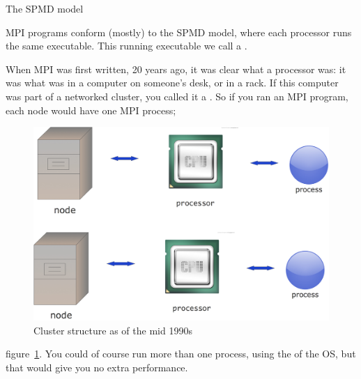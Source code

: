 
%
 {The SPMD model}

MPI programs conform (mostly)
to the \acf{SPMD} model, where each processor runs the same executable.
This running executable we call a .

When MPI was first written, 20 years ago, it was clear what a processor
was: it was what was in a computer on someone's desk, or in a rack.
If this computer was part of a networked cluster, you called it a .
So if you ran an MPI program, each node would have one MPI process;
%
\begin{figure}[ht]
  \includegraphics[scale=.11]{graphics/mpi-node1}
  \caption{Cluster structure as of the mid 1990s}
  \label{fig:oldmpi}
\end{figure}
%
figure~\ref{fig:oldmpi}.
%
You could of course run more than one
process, using the  of the \ac{OS}, but that
would give you no extra performance.


